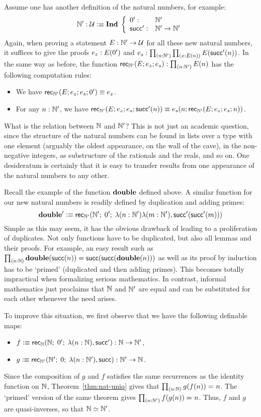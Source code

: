 Assume one has another definition of the natural numbers, for example:
\[  \mathbb{N}' : \mathcal{U} \vcentcolon\equiv \mathbf{Ind \;} \left\{
\begin{array}{ll}
0' : & \mathbb{N}' \\
\mathsf{succ}' : & \mathbb{N}' \to \mathbb{N}'
\end{array}
\right. \]
Again, when proving a statement $E : \mathbb{N}' \to \mathcal{U}$ for all these new natural numbers, it suffices to give the proofs $e_z : E(0')$ and $e_s : \prd{n : \natp}{x : E(n)} E(\Sp(n))$. In the same way as before, the function $\rec\natp(E;e_z;e_s) : \prd{n:\natp} E(n)$
has the following computation rules:
\begin{itemize}
\item We have $\mathsf{rec}_{\mathbb{N}'}(E;e_z;e_s;0') \equiv e_z$.
\item For any $n : \mathbb{N}'$, we have $\mathsf{rec}_{\mathbb{N}'}(E;e_z;e_s;\mathsf{succ}'(n)) \equiv e_s(n;\mathsf{rec}_{\mathbb{N}'}(E;e_z;e_s;n))$.
\end{itemize}
What is the relation between $\mathbb{N}$ and $\mathbb{N}'$?
This is not just an academic question, since the structure of the natural numbers
can be found in lists over a type with one element (arguably the oldest appearance,
on the wall of the cave), in the non-negative integers, as substructure of the
rationals and the reals, and so on. One desideratum is certainly that it is easy to
transfer results from one appearance of the natural numbers to any other.

Recall the example of the function $\mathbf{double}$ defined above. A similar function
for our new natural numbers is readily defined by duplication and adding primes:
\[ \mathbf{double'} \vcentcolon\equiv \mathsf{rec}_{\mathbb{N}'}(\mathbb{N}'; \; 0'; \;  \lambda(n: \mathbb{N}') \lambda (m:\mathbb{N}'), \mathsf{succ}'(\mathsf{succ}'(m))) \]
Simple as this may seem, it has the obvious drawback of leading to a
proliferation of duplicates. Not only functions have to be
duplicated, but also all lemmas and their proofs. For example,
an easy result such as  $\prd{n : \nat} \dbl(\s(n))=\s(\s(\dbl(n)))$ as well
as its proof by induction has to be `primed' (duplicated and then adding primes).
This becomes totally impractical when formalizing serious mathematics.
In contrast, informal mathematics just proclaims that $\mathbb{N}$ and $\mathbb{N}'$ are
equal and can be substituted for each other whenever the need arises.

To improve this situation, we first observe that we have the following definable maps:
\begin{itemize}
\item $f \vcentcolon\equiv \mathsf{rec}_{\mathbb{N}}(\mathbb{N}; \; 0'; \;  \lambda(n: \mathbb{N}), \mathsf{succ}')
       : \mathbb{N} \to\mathbb{N}'$,
\item $g \vcentcolon\equiv \mathsf{rec}_{\mathbb{N}'}(\mathbb{N}'; \; 0; \;  \lambda(n: \mathbb{N}'), \mathsf{succ})
       : \mathbb{N}' \to\mathbb{N}$.
\end{itemize}
Since the composition of $g$ and $f$ satisfies the same recurrences as the identity function on $\mathbb{N}$, Theorem~\ref{thm:nat-uniq} gives that $\prd{n : \nat} \id{g(f(n))}{n}$. The `primed' version of the same theorem gives $\prd{n : \natp} \id{f(g(n))}{n}$.
Thus, $f$ and $g$ are quasi-inverses, so that $\mathbb{N} \simeq \mathbb{N}'$.

